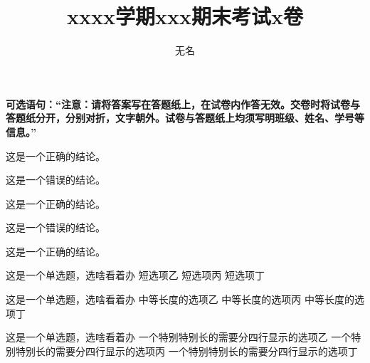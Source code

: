 \documentclass[answer,sheet]{cuzexam} %
\title{xxxx学期xxx期末考试x卷}
\author{无名}
\begin{document}
\makehead

\begin{extracomment}
    \textbf{可选语句：“注意：请将答案写在答题纸上，在试卷内作答无效。交卷时将试卷与答题纸分开，分别对折，文字朝外。试卷与答题纸上均须写明班级、姓名、学号等信息。”}
\end{extracomment}


\begin{problem}
    这是一个正确的结论。
\end{problem}

\begin{problem}
    这是一个错误的结论。
\end{problem}

\begin{problem}
    这是一个正确的结论。
\end{problem}

\begin{problem}
    这是一个错误的结论。
\end{problem}

\begin{problem}
    这是一个正确的结论。
\end{problem}

\begin{sheetcontents}
\end{sheetcontents}


\begin{problem}
    这是一个单选题，选啥看着办
    {短选项乙}
    {短选项丙}
    {短选项丁}
\end{problem}

\begin{problem}
    这是一个单选题，选啥看着办
    {中等长度的选项乙}
    {中等长度的选项丙}
    {中等长度的选项丁}
\end{problem}

\begin{problem}
    这是一个单选题，选啥看着办
    {一个特别特别长的需要分四行显示的选项乙}
    {一个特别特别长的需要分四行显示的选项丙}
    {一个特别特别长的需要分四行显示的选项丁}
\end{problem}
\end{document}
